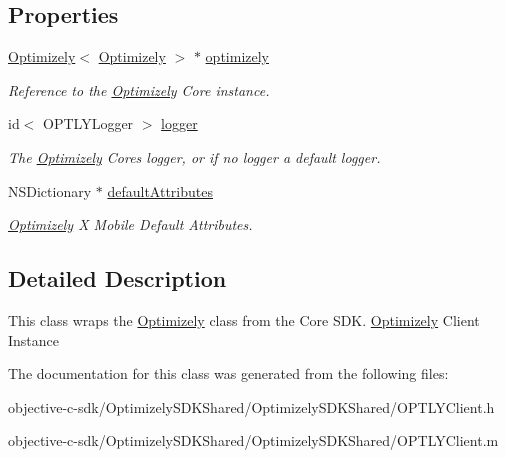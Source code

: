\subsection*{Properties}
\begin{DoxyCompactItemize}
\item 
\mbox{\label{interface_o_p_t_l_y_client_a01e56e5011c3e16084bcd6bcc6fa1753}} 
\mbox{\hyperlink{interface_optimizely}{Optimizely}}$<$ \mbox{\hyperlink{interface_optimizely}{Optimizely}} $>$ $\ast$ \mbox{\hyperlink{interface_o_p_t_l_y_client_a01e56e5011c3e16084bcd6bcc6fa1753}{optimizely}}
\begin{DoxyCompactList}\small\item\em Reference to the \mbox{\hyperlink{interface_optimizely}{Optimizely}} Core instance. \end{DoxyCompactList}\item 
\mbox{\label{interface_o_p_t_l_y_client_ae46071616b8126ec639e2a302a6d9161}} 
id$<$ O\+P\+T\+L\+Y\+Logger $>$ \mbox{\hyperlink{interface_o_p_t_l_y_client_ae46071616b8126ec639e2a302a6d9161}{logger}}
\begin{DoxyCompactList}\small\item\em The \mbox{\hyperlink{interface_optimizely}{Optimizely}} Core\textquotesingle{}s logger, or if no logger a default logger. \end{DoxyCompactList}\item 
\mbox{\label{interface_o_p_t_l_y_client_a196e374d2b100d05de66e8163b526985}} 
N\+S\+Dictionary $\ast$ \mbox{\hyperlink{interface_o_p_t_l_y_client_a196e374d2b100d05de66e8163b526985}{default\+Attributes}}
\begin{DoxyCompactList}\small\item\em \mbox{\hyperlink{interface_optimizely}{Optimizely}} X Mobile Default Attributes. \end{DoxyCompactList}\end{DoxyCompactItemize}


\subsection{Detailed Description}
This class wraps the \mbox{\hyperlink{interface_optimizely}{Optimizely}} class from the Core S\+DK. \mbox{\hyperlink{interface_optimizely}{Optimizely}} Client Instance 

The documentation for this class was generated from the following files\+:\begin{DoxyCompactItemize}
\item 
objective-\/c-\/sdk/\+Optimizely\+S\+D\+K\+Shared/\+Optimizely\+S\+D\+K\+Shared/O\+P\+T\+L\+Y\+Client.\+h\item 
objective-\/c-\/sdk/\+Optimizely\+S\+D\+K\+Shared/\+Optimizely\+S\+D\+K\+Shared/O\+P\+T\+L\+Y\+Client.\+m\end{DoxyCompactItemize}
